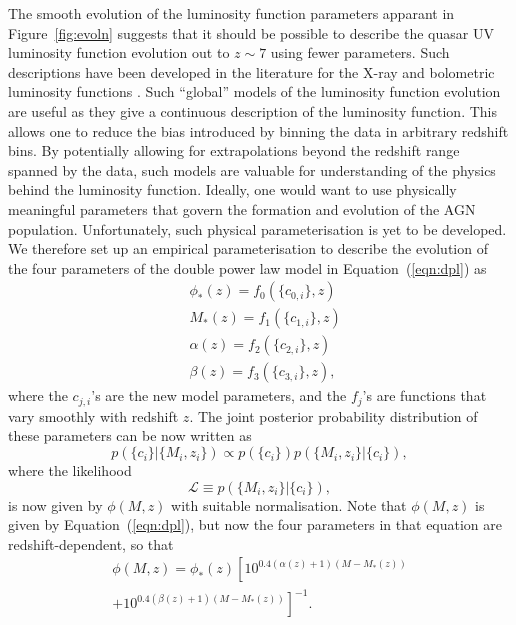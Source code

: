 \documentclass[fleqn,usenatbib]{mnras}
\begin{document}
The smooth evolution of the luminosity function parameters apparant in
Figure~\ref{fig:evoln} suggests that it should be possible to describe
the quasar UV luminosity function evolution out to $z\sim 7$ using
fewer parameters.  Such descriptions have been developed in the
literature for the X-ray \citep[e.g.,][]{2015MNRAS.451.1892A} and
bolometric luminosity functions \citep[e.g.,][]{2007ApJ...654..731H}.
Such ``global'' models of the luminosity function evolution are useful
as they give a continuous description of the luminosity function.
This allows one to reduce the bias introduced by binning the data in
arbitrary redshift bins.  By potentially allowing for extrapolations
beyond the redshift range spanned by the data, such models are
valuable for understanding of the physics behind the luminosity
function.  Ideally, one would want to use physically meaningful
parameters that govern the formation and evolution of the AGN
population.  Unfortunately, such physical parameterisation is yet to
be developed.  We therefore set up an empirical parameterisation to
describe the evolution of the four parameters of the double power law
model in Equation~(\ref{eqn:dpl}) as
\begin{align}
  &\phi_*(z) = f_0(\{c_{0,i}\}, z)\nonumber\\
  &M_*(z) = f_1(\{c_{1,i}\}, z)\nonumber\\
  &\alpha(z) = f_2(\{c_{2,i}\}, z)\nonumber\\
  &\beta(z) = f_3(\{c_{3,i}\}, z),
  \label{eqn:global}
\end{align}
where the $c_{j,i}$'s are the new model parameters, and the $f_j$'s
are functions that vary smoothly with redshift $z$.  The joint
posterior probability distribution of these parameters can be now
written as
\begin{equation}
  p(\{c_i\} | \{M_i, z_i\}) \propto p(\{c_i\})p(\{M_i, z_i\} | \{c_i\}),
\end{equation}
where the likelihood 
\begin{equation}
  \mathcal{L}\equiv p(\{M_i, z_i\} | \{c_i\}),
\end{equation}
is now given by $\phi(M,z)$ with suitable normalisation.  Note that
$\phi(M,z)$ is given by Equation~(\ref{eqn:dpl}), but now the four
parameters in that equation are redshift-dependent, so that
\begin{multline}
  \phi(M,z) = \phi_*(z) \left[10^{0.4(\alpha(z)+1)(M-M_*(z))}\right. \\ \left.+ 10^{0.4(\beta(z)+1)(M-M_*(z))}\right]^{-1}.
\end{multline}
\end{document}
